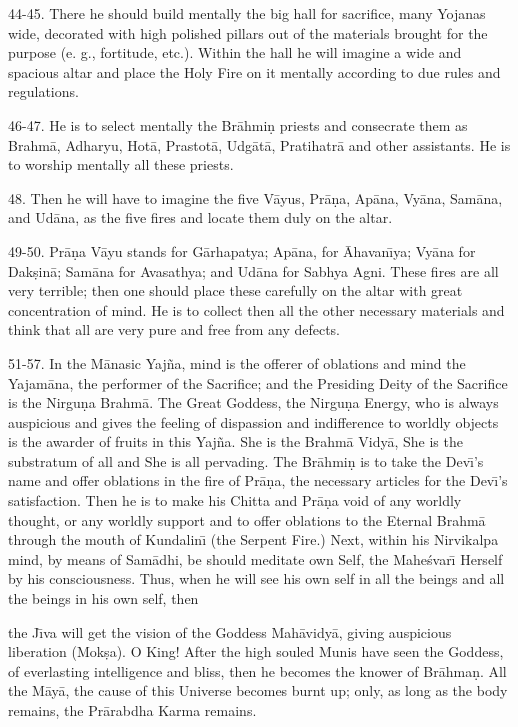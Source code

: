 44-45. There he should build mentally the big hall for sacrifice, many Yojanas wide, decorated with high polished pillars out of the materials brought for the purpose (e. g., fortitude, etc.). Within the hall he will imagine a wide and spacious altar and place the Holy Fire on it mentally according to due rules and regulations.

46-47. He is to select mentally the Br\=ahmi\d{n} priests and consecrate them as Brahm\=a, Adharyu, Hot\=a, Prastot\=a, Udg\=at\=a, Pratihatr\=a and other assistants. He is to worship mentally all these priests.

48. Then he will have to imagine the five V\=ayus, Pr\=a\d{n}a, Ap\=ana, Vy\=ana, Sam\=ana, and Ud\=ana, as the five fires and locate them duly on the altar.

49-50. Pr\=a\d{n}a V\=ayu stands for G\=arhapatya; Ap\=ana, for \=Ahavan\={\i}ya; Vy\=ana for Dak\d{s}in\=a; Sam\=ana for Avasathya; and Ud\=ana for Sabhya Agni. These fires are all very terrible; then one should place these carefully on the altar with great concentration of mind. He is to collect then all the other necessary materials and think that all are very pure and free from any defects.

51-57. In the M\=anasic Yaj\~na, mind is the offerer of oblations and mind the Yajam\=ana, the performer of the Sacrifice; and the Presiding Deity of the Sacrifice is the Nirgu\d{n}a Brahm\=a. The Great Goddess, the Nirgu\d{n}a Energy, who is always auspicious and gives the feeling of dispassion and indifference to worldly objects is the awarder of fruits in this Yaj\~na. She is the Brahm\=a Vidy\=a, She is the substratum of all and She is all pervading. The Br\=ahmi\d{n} is to take the Dev\={\i}'s name and offer oblations in the fire of Pr\=a\d{n}a, the necessary articles for the Dev\={\i}'s satisfaction. Then he is to make his Chitta and Pr\=a\d{n}a void of any worldly thought, or any worldly support and to offer oblations to the Eternal Brahm\=a through the mouth of Kundalin\={\i} (the Serpent Fire.) Next, within his Nirvikalpa mind, by means of Sam\=adhi, be should meditate own Self, the Mahe\'svar\={\i} Herself by his consciousness. Thus, when he will see his own self in all the beings and all the beings in his own self, then

the J\={\i}va will get the vision of the Goddess Mah\=avidy\=a, giving auspicious liberation (Mok\d{s}a). O King! After the high souled Munis have seen the Goddess, of everlasting intelligence and bliss, then he becomes the knower of Br\=ahma\d{n}. All the M\=ay\=a, the cause of this Universe becomes burnt up; only, as long as the body remains, the Pr\=arabdha Karma remains.

